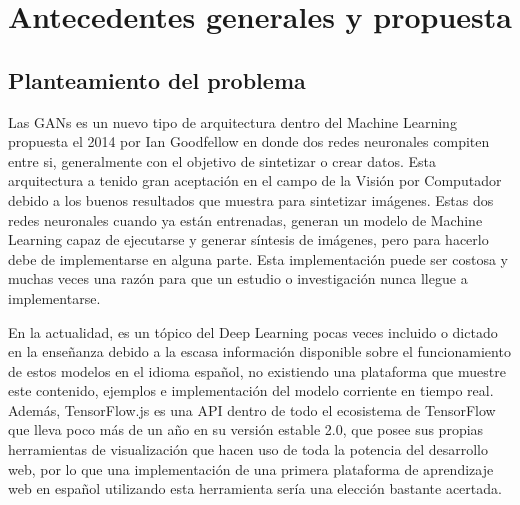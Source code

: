 \chapter{Antecedentes generales y propuesta} %
\label{cap:antecedentes} %
\vspace*{-2cm} %




\section{Planteamiento del problema}
Las GANs es un nuevo tipo de arquitectura dentro del Machine Learning propuesta el 2014 por Ian Goodfellow \cite{goodfellowGenerativeAdversarialNetworks2014}
en donde dos redes neuronales compiten entre si, generalmente con el objetivo de sintetizar o crear datos.
Esta arquitectura a tenido gran aceptación en el campo de la Visión por Computador debido a los buenos resultados que muestra
para sintetizar imágenes. Estas dos redes neuronales cuando ya están entrenadas, generan un modelo de Machine Learning capaz de ejecutarse
y generar síntesis de imágenes, pero para hacerlo debe de implementarse en alguna parte. Esta implementación puede ser costosa y muchas veces
una razón para que un estudio o investigación nunca llegue a implementarse.

En la actualidad, es un tópico del Deep Learning pocas veces incluido o dictado  en la enseñanza
debido a la escasa información disponible sobre el funcionamiento de estos modelos en el idioma español, no existiendo una plataforma que muestre este contenido, ejemplos e implementación del modelo corriente en tiempo real.
Además, TensorFlow.js es una API dentro de todo el ecosistema de TensorFlow que lleva poco
más de un año en su versión estable 2.0, que posee sus propias herramientas de visualización que hacen uso de toda la potencia del desarrollo web, por lo que una implementación de una primera plataforma de aprendizaje web en español utilizando esta herramienta sería una elección bastante acertada.


